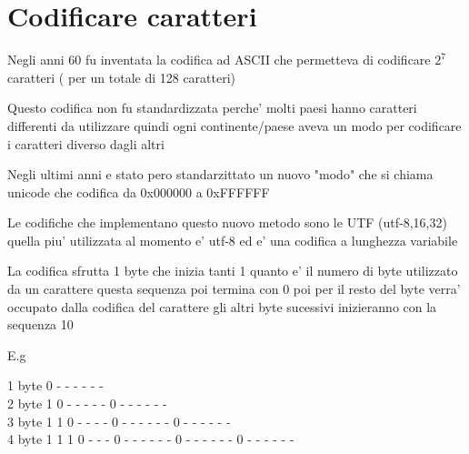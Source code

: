\documentclass{article}
\begin{document}
          \section{Codificare caratteri}
          \begin{flushleft}
            Negli anni 60 fu inventata la codifica ad ASCII che permetteva di codificare $2^7$ caratteri ( per un totale di 128 caratteri) 
          \end{flushleft}
          \begin{flushleft}
            Questo codifica non fu standardizzata perche' molti paesi hanno caratteri differenti da utilizzare
            quindi ogni continente/paese aveva un modo per codificare i caratteri diverso dagli altri
          \end{flushleft}
          \begin{flushleft}
            Negli ultimi anni e stato pero standarzittato un nuovo "modo" che si chiama unicode che codifica
            da 0x000000 a 0xFFFFFF
          \end{flushleft}
          \begin{flushleft}
            Le codifiche che implementano questo nuovo metodo sono le UTF (utf-8,16,32) quella piu' utilizzata al momento e' utf-8
            ed e' una codifica a lunghezza variabile 
          \end{flushleft}
          \begin{flushleft}
           La codifica sfrutta 1 byte che inizia tanti 1 quanto e' il numero di byte utilizzato da un carattere questa sequenza poi termina con 0 
           poi per il resto del byte verra' occupato dalla codifica del carattere gli altri byte sucessivi inizieranno con la sequenza 10
          \end{flushleft}
          E.g
          \begin{flushleft}
            1 byte  0 - - - - - - \quad \\
            2 byte   1 0 - - - - -       0 - - - - - - \\
            3 byte   1 1 0 - - - -       0 - - - - - -  0 - - - - - - \\
            4 byte   1 1 1 0 - - -       0 - - - - - -       0 - - - - - -      0 - - - - - -\\
          \end{flushleft}
        
\end{document}
